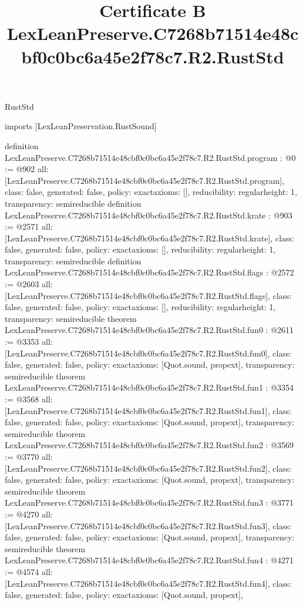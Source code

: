 \begin{lexlean}{RustStd}
\title{Certificate B LexLeanPreserve.C7268b71514e48cbf0c0bc6a45e2f78c7.R2.RustStd}
\begin{coremodule}
imports [LexLeanPreservation.RustSound]

definition LexLeanPreserve.C7268b71514e48cbf0c0bc6a45e2f78c7.R2.RustStd.program : @0 := @902 {
  all: [LexLeanPreserve.C7268b71514e48cbf0c0bc6a45e2f78c7.R2.RustStd.program],
  class: false,
  generated: false,
  policy: exact{axioms: []},
  reducibility: regular{height: 1},
  transparency: semireducible
}
definition LexLeanPreserve.C7268b71514e48cbf0c0bc6a45e2f78c7.R2.RustStd.krate : @903 := @2571 {
  all: [LexLeanPreserve.C7268b71514e48cbf0c0bc6a45e2f78c7.R2.RustStd.krate],
  class: false,
  generated: false,
  policy: exact{axioms: []},
  reducibility: regular{height: 1},
  transparency: semireducible
}
definition LexLeanPreserve.C7268b71514e48cbf0c0bc6a45e2f78c7.R2.RustStd.flags : @2572 := @2603 {
  all: [LexLeanPreserve.C7268b71514e48cbf0c0bc6a45e2f78c7.R2.RustStd.flags],
  class: false,
  generated: false,
  policy: exact{axioms: []},
  reducibility: regular{height: 1},
  transparency: semireducible
}
theorem LexLeanPreserve.C7268b71514e48cbf0c0bc6a45e2f78c7.R2.RustStd.fun0 : @2611 := @3353 {
  all: [LexLeanPreserve.C7268b71514e48cbf0c0bc6a45e2f78c7.R2.RustStd.fun0],
  class: false,
  generated: false,
  policy: exact{axioms: [Quot.sound, propext]},
  transparency: semireducible
}
theorem LexLeanPreserve.C7268b71514e48cbf0c0bc6a45e2f78c7.R2.RustStd.fun1 : @3354 := @3568 {
  all: [LexLeanPreserve.C7268b71514e48cbf0c0bc6a45e2f78c7.R2.RustStd.fun1],
  class: false,
  generated: false,
  policy: exact{axioms: [Quot.sound, propext]},
  transparency: semireducible
}
theorem LexLeanPreserve.C7268b71514e48cbf0c0bc6a45e2f78c7.R2.RustStd.fun2 : @3569 := @3770 {
  all: [LexLeanPreserve.C7268b71514e48cbf0c0bc6a45e2f78c7.R2.RustStd.fun2],
  class: false,
  generated: false,
  policy: exact{axioms: [Quot.sound, propext]},
  transparency: semireducible
}
theorem LexLeanPreserve.C7268b71514e48cbf0c0bc6a45e2f78c7.R2.RustStd.fun3 : @3771 := @4270 {
  all: [LexLeanPreserve.C7268b71514e48cbf0c0bc6a45e2f78c7.R2.RustStd.fun3],
  class: false,
  generated: false,
  policy: exact{axioms: [Quot.sound, propext]},
  transparency: semireducible
}
theorem LexLeanPreserve.C7268b71514e48cbf0c0bc6a45e2f78c7.R2.RustStd.fun4 : @4271 := @4574 {
  all: [LexLeanPreserve.C7268b71514e48cbf0c0bc6a45e2f78c7.R2.RustStd.fun4],
  class: false,
  generated: false,
  policy: exact{axioms: [Quot.sound, propext]},
}
\end{coremodule}
\end{lexlean}
